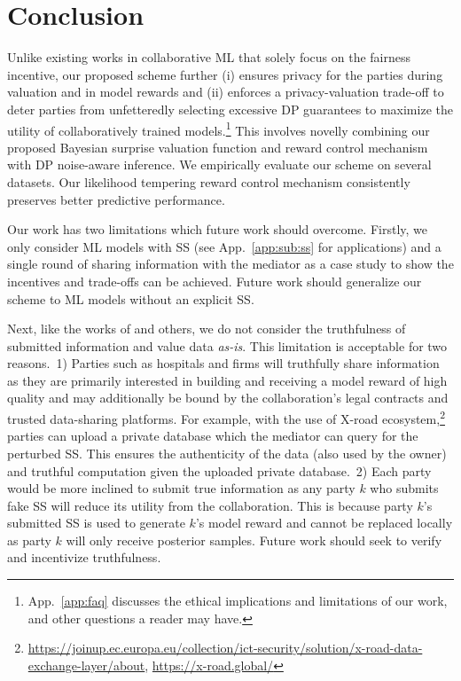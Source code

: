 \documentclass{article}
\theoremstyle{plain}
\theoremstyle{definition}
\theoremstyle{remark}
\renewcommand{\citet}[1]{\cite{#1}}
\begin{document}
\section{Conclusion}
\label{sec:conclusion}
Unlike existing works in collaborative ML that solely focus on the fairness incentive, our proposed scheme further (i) ensures privacy for the parties during valuation and in model rewards and (ii) enforces a privacy-valuation trade-off to deter parties from unfetteredly selecting excessive DP guarantees to maximize the utility of collaboratively trained models.\footnote{App.~\ref{app:faq} discusses the ethical implications and limitations of our work, and other questions a reader may have.} This involves novelly combining our proposed Bayesian surprise valuation function and reward control mechanism with DP noise-aware inference.
We empirically evaluate our scheme on several datasets. Our likelihood tempering reward control mechanism consistently preserves better predictive performance.

Our work has two limitations which future work should overcome. Firstly, we only consider ML models with SS (see App.~\ref{app:sub:ss} for applications) and a single round of sharing information with the mediator as a case study to show the incentives and trade-offs can be achieved. Future work should generalize our scheme to ML models without an explicit SS.

Next, like the works of \citet{ghorbani2019data,ghorbani2020,jia2019towards,nguyen22trade,simcollaborative,tay2021} and others, we do not consider the truthfulness of submitted information and value data \textit{as-is}. This limitation is acceptable for two reasons.\ 1) Parties such as hospitals and firms will truthfully share information as they are primarily interested in building and receiving a model reward of high quality and may additionally be bound by the collaboration's legal contracts and trusted data-sharing platforms.
For example, with the use of X-road ecosystem,\footnote{\url{https://joinup.ec.europa.eu/collection/ict-security/solution/x-road-data-exchange-layer/about}, \url{https://x-road.global/}} parties can upload a private database which the mediator can query for the perturbed SS. This ensures the authenticity of the data (also used by the owner) and truthful computation given the uploaded private database.\ 2) Each party would be more inclined to submit true information as any party $k$ who submits fake SS will reduce its utility from the collaboration. This is because party $k$'s submitted SS is used to generate $k$'s model reward and cannot be replaced locally as party $k$ will only receive posterior samples. Future work should seek to verify and incentivize truthfulness.
\end{document}
